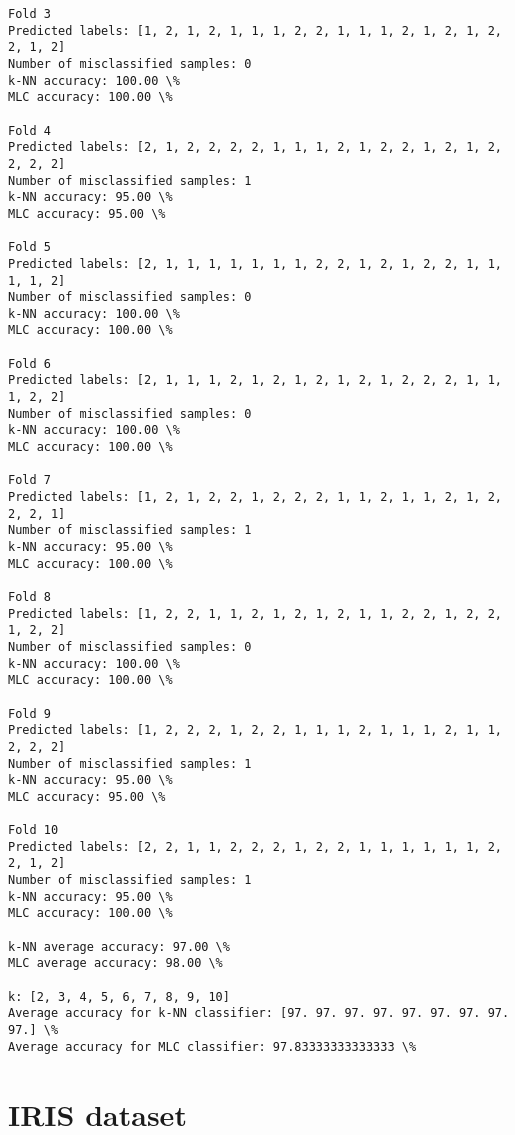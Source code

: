 \documentclass[11pt]{article}
\begin{document}
\begin{Verbatim}[commandchars=\\\{\}]
Fold 3
Predicted labels: [1, 2, 1, 2, 1, 1, 1, 2, 2, 1, 1, 1, 2, 1, 2, 1, 2, 2, 1, 2]
Number of misclassified samples: 0
k-NN accuracy: 100.00 \%
MLC accuracy: 100.00 \%

Fold 4
Predicted labels: [2, 1, 2, 2, 2, 2, 1, 1, 1, 2, 1, 2, 2, 1, 2, 1, 2, 2, 2, 2]
Number of misclassified samples: 1
k-NN accuracy: 95.00 \%
MLC accuracy: 95.00 \%

Fold 5
Predicted labels: [2, 1, 1, 1, 1, 1, 1, 1, 2, 2, 1, 2, 1, 2, 2, 1, 1, 1, 1, 2]
Number of misclassified samples: 0
k-NN accuracy: 100.00 \%
MLC accuracy: 100.00 \%

Fold 6
Predicted labels: [2, 1, 1, 1, 2, 1, 2, 1, 2, 1, 2, 1, 2, 2, 2, 1, 1, 1, 2, 2]
Number of misclassified samples: 0
k-NN accuracy: 100.00 \%
MLC accuracy: 100.00 \%

Fold 7
Predicted labels: [1, 2, 1, 2, 2, 1, 2, 2, 2, 1, 1, 2, 1, 1, 2, 1, 2, 2, 2, 1]
Number of misclassified samples: 1
k-NN accuracy: 95.00 \%
MLC accuracy: 100.00 \%

Fold 8
Predicted labels: [1, 2, 2, 1, 1, 2, 1, 2, 1, 2, 1, 1, 2, 2, 1, 2, 2, 1, 2, 2]
Number of misclassified samples: 0
k-NN accuracy: 100.00 \%
MLC accuracy: 100.00 \%

Fold 9
Predicted labels: [1, 2, 2, 2, 1, 2, 2, 1, 1, 1, 2, 1, 1, 1, 2, 1, 1, 2, 2, 2]
Number of misclassified samples: 1
k-NN accuracy: 95.00 \%
MLC accuracy: 95.00 \%

Fold 10
Predicted labels: [2, 2, 1, 1, 2, 2, 2, 1, 2, 2, 1, 1, 1, 1, 1, 1, 2, 2, 1, 2]
Number of misclassified samples: 1
k-NN accuracy: 95.00 \%
MLC accuracy: 100.00 \%

k-NN average accuracy: 97.00 \%
MLC average accuracy: 98.00 \%

k: [2, 3, 4, 5, 6, 7, 8, 9, 10]
Average accuracy for k-NN classifier: [97. 97. 97. 97. 97. 97. 97. 97. 97.] \%
Average accuracy for MLC classifier: 97.83333333333333 \%

    \end{Verbatim}

    \hypertarget{iris-dataset}{%
\section{IRIS dataset}\label{iris-dataset}}
\end{document}
